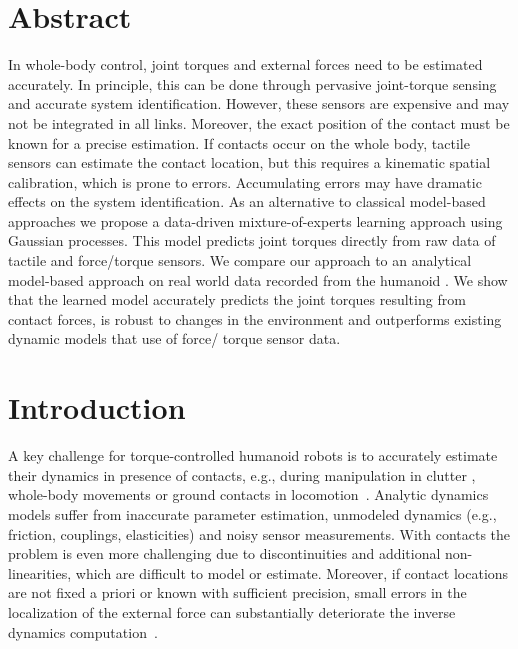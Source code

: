 \section*{Abstract}
In whole-body control, joint torques and external forces need to be estimated
accurately. In principle, this can be done through pervasive joint-torque
sensing and accurate system identification. However, these sensors are expensive
and may not be integrated in all links. Moreover, the exact position of the
contact must be known for  a precise estimation. If contacts occur on the whole
body, tactile sensors can estimate the contact location, but this requires a
kinematic spatial calibration, which is prone to errors. Accumulating errors may
have dramatic effects on the system identification. As an alternative to
classical model-based approaches we propose a data-driven mixture-of-experts
learning approach using Gaussian processes. This model predicts joint torques
directly from raw data of tactile and force\slash torque sensors. We compare our
approach to an analytical model-based approach on real world data recorded from
the humanoid \robot{}. We show that the learned model accurately predicts the
joint torques resulting from contact forces, is robust to changes in the
environment and outperforms existing dynamic models that use of force\slash
torque sensor data. %


\section{Introduction}\label{sec:introduction}

A key challenge for torque-controlled humanoid robots is to accurately estimate
their dynamics in presence of contacts, e.g., during manipulation in clutter
\cite{Jain2013clutter}, whole-body movements \cite{Handbook2008legged} or ground
contacts in locomotion~\cite{Calandra2014}. Analytic dynamics models suffer from
inaccurate parameter estimation, unmodeled dynamics (e.g., friction, couplings,
elasticities) and noisy sensor measurements. With contacts the problem is even
more challenging due to discontinuities and additional non-linearities, which
are difficult to model or estimate. Moreover, if contact locations are not fixed
a priori or known with sufficient precision, small errors in the localization of
the external force can substantially deteriorate the inverse dynamics
computation~\cite{DelPrete2012}.

